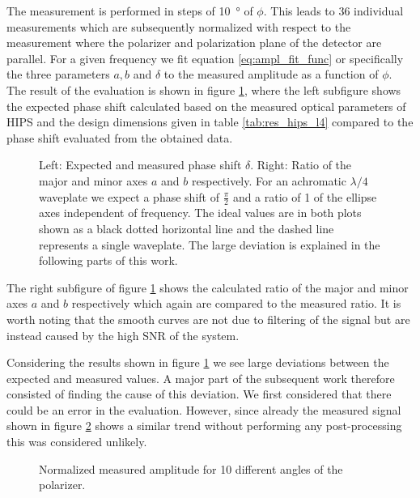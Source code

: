 The measurement is performed in steps of \SI{10}{\degree} of $\phi$. This leads to 36 individual measurements which are subsequently normalized with respect to the measurement where the polarizer and polarization plane of the detector are parallel. For a given frequency we fit equation \ref{eq:ampl_fit_func} or specifically the three parameters $a,b$ and $\delta$ to the measured amplitude as a function of $\phi$. The result of the evaluation is shown in figure \ref{fig:meas_result}, where the left subfigure shows the expected phase shift calculated based on the measured optical parameters of HIPS and the design dimensions given in table \ref{tab:res_hips_l4} compared to the phase shift evaluated from the obtained data. 
\begin{figure}[H]
    \centering
    
    \caption{Left: Expected and measured phase shift $\delta$. Right: Ratio of the major and minor axes $a$ and $b$ respectively. For an achromatic $\lambda/4$ waveplate we expect a phase shift of $\frac{\pi}{2}$ and a ratio of 1 of the ellipse axes independent of frequency. The ideal values are in both plots shown as a black dotted horizontal line and the dashed line represents a single waveplate. The large deviation is explained in the following parts of this work.}
    \label{fig:meas_result}
\end{figure}

The right subfigure of figure \ref{fig:meas_result} shows the calculated ratio of the major and minor axes $a$ and $b$ respectively which again are compared to the measured ratio. It is worth noting that the smooth curves are not due to filtering of the signal but are instead caused by the high SNR of the system.

Considering the results shown in figure \ref{fig:meas_result} we see large deviations between the expected and measured values. A major part of the subsequent work therefore consisted of finding the cause of this deviation. We first considered that there could be an error in the evaluation. However, since already the measured signal shown in figure \ref{fig:measured_amplitude} shows a similar trend without performing any post-processing this was considered unlikely.

\begin{figure}[H]
    \centering
    
    \caption{Normalized measured amplitude for 10 different angles of the polarizer.}
    \label{fig:measured_amplitude}
\end{figure}

